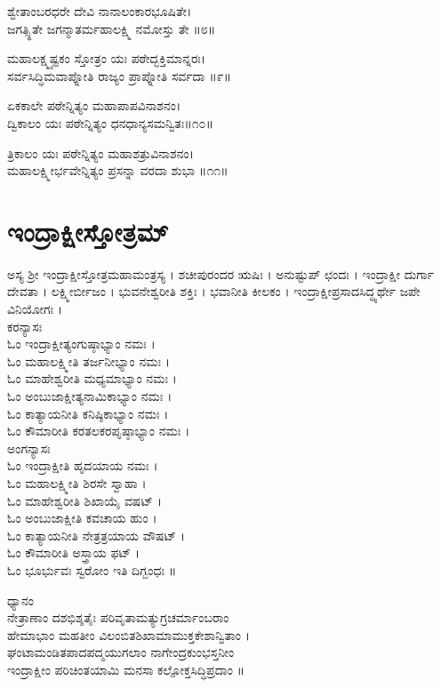 	ಶ್ವೇತಾಂಬರಧರೇ ದೇವಿ ನಾನಾಲಂಕಾರಭೂಷಿತೇ।\\
	ಜಗತ್ಸ್ಥಿತೇ ಜಗನ್ಮಾತರ್ಮಹಾಲಕ್ಷ್ಮಿ ನಮೋಸ್ತು ತೇ ॥೮॥

ಮಹಾಲಕ್ಷ್ಮ್ಯಷ್ಟಕಂ ಸ್ತೋತ್ರಂ ಯಃ ಪಠೇದ್ಭಕ್ತಿಮಾನ್ನರಃ।\\
ಸರ್ವಸಿದ್ಧಿಮವಾಪ್ನೋತಿ ರಾಜ್ಯಂ ಪ್ರಾಪ್ನೋತಿ ಸರ್ವದಾ ॥೯॥

	ಏಕಕಾಲೇ ಪಠೇನ್ನಿತ್ಯಂ ಮಹಾಪಾಪವಿನಾಶನಂ।\\
	ದ್ವಿಕಾಲಂ ಯಃ ಪಠೇನ್ನಿತ್ಯಂ ಧನಧಾನ್ಯಸಮನ್ವಿತಃ॥೧೦॥

ತ್ರಿಕಾಲಂ ಯಃ ಪಠೇನ್ನಿತ್ಯಂ ಮಹಾಶತ್ರುವಿನಾಶನಂ।\\
ಮಹಾಲಕ್ಷ್ಮೀರ್ಭವೇನ್ನಿತ್ಯಂ ಪ್ರಸನ್ನಾ ವರದಾ ಶುಭಾ ॥೧೧॥

\section{ಇಂದ್ರಾಕ್ಷೀಸ್ತೋತ್ರಮ್}
ಅಸ್ಯ ಶ್ರೀ ಇಂದ್ರಾಕ್ಷೀಸ್ತೋತ್ರಮಹಾಮಂತ್ರಸ್ಯ । ಶಚೀಪುರಂದರ ಋಷಿಃ । ಅನುಷ್ಟುಪ್ ಛಂದಃ । ಇಂದ್ರಾಕ್ಷೀ ದುರ್ಗಾ ದೇವತಾ । ಲಕ್ಷ್ಮೀರ್ಬೀಜಂ । ಭುವನೇಶ್ವರೀತಿ ಶಕ್ತಿಃ । ಭವಾನೀತಿ ಕೀಲಕಂ  । ಇಂದ್ರಾಕ್ಷೀಪ್ರಸಾದಸಿದ್ಧ್ಯರ್ಥೇ ಜಪೇ ವಿನಿಯೋಗಃ ।\\
ಕರನ್ಯಾಸಃ\\
ಓಂ ಇಂದ್ರಾಕ್ಷೀತ್ಯಂಗುಷ್ಠಾಭ್ಯಾಂ ನಮಃ ।\\
ಓಂ ಮಹಾಲಕ್ಷ್ಮೀತಿ ತರ್ಜನೀಭ್ಯಾಂ ನಮಃ ।\\
ಓಂ ಮಾಹೇಶ್ವರೀತಿ ಮಧ್ಯಮಾಭ್ಯಾಂ ನಮಃ ।\\
ಓಂ ಅಂಬುಜಾಕ್ಷೀತ್ಯನಾಮಿಕಾಭ್ಯಾಂ ನಮಃ ।\\
ಓಂ ಕಾತ್ಯಾಯನೀತಿ ಕನಿಷ್ಠಿಕಾಭ್ಯಾಂ ನಮಃ ।\\
ಓಂ ಕೌಮಾರೀತಿ ಕರತಲಕರಪೃಷ್ಠಾಭ್ಯಾಂ ನಮಃ ।\\
ಅಂಗನ್ಯಾಸಃ\\
ಓಂ ಇಂದ್ರಾಕ್ಷೀತಿ ಹೃದಯಾಯ ನಮಃ ।\\
ಓಂ ಮಹಾಲಕ್ಷ್ಮೀತಿ ಶಿರಸೇ ಸ್ವಾಹಾ ।\\
ಓಂ ಮಾಹೇಶ್ವರೀತಿ ಶಿಖಾಯೈ ವಷಟ್ ।\\
ಓಂ ಅಂಬುಜಾಕ್ಷೀತಿ ಕವಚಾಯ ಹುಂ ।\\
ಓಂ ಕಾತ್ಯಾಯನೀತಿ ನೇತ್ರತ್ರಯಾಯ ವೌಷಟ್ ।\\
ಓಂ ಕೌಮಾರೀತಿ ಅಸ್ತ್ರಾಯ ಫಟ್ ।\\
ಓಂ ಭೂರ್ಭುವಃ ಸ್ವರೋಂ ಇತಿ ದಿಗ್ಬಂಧಃ ॥

ಧ್ಯಾನಂ\\
ನೇತ್ರಾಣಾಂ ದಶಭಿಶ್ಶತೈಃ ಪರಿವೃತಾಮತ್ಯುಗ್ರಚರ್ಮಾಂಬರಾಂ\\
ಹೇಮಾಭಾಂ ಮಹತೀಂ ವಿಲಂಬಿತಶಿಖಾಮಾಮುಕ್ತಕೇಶಾನ್ವಿತಾಂ ।\\
ಘಂಟಾಮಂಡಿತಪಾದಪದ್ಮಯುಗಲಾಂ ನಾಗೇಂದ್ರಕುಂಭಸ್ತನೀಂ\\
ಇಂದ್ರಾಕ್ಷೀಂ ಪರಿಚಿಂತಯಾಮಿ ಮನಸಾ ಕಲ್ಪೋಕ್ತಸಿದ್ಧಿಪ್ರದಾಂ ॥

